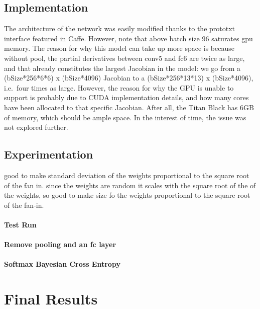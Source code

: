 \documentclass[a4paper,11pt]{article}
\begin{document}
\subsection{Implementation}

The architecture of the network was easily modified thanks to the prototxt interface featured in Caffe. However, note that above batch size 96 saturates gpu memory. The reason for why this model can take up more space is because without pool, the partial derivatives between conv5 and fc6 are twice as large, and that already constitutes the largest Jacobian in the model: we go from a (bSize*256*6*6) x (bSize*4096) Jacobian to a (bSize*256*13*13) x (bSize*4096), i.e.\ four times as large. However, the reason for why the GPU is unable to support is probably due to CUDA implementation details, and how many cores have been allocated to that specific Jacobian. After all, the Titan Black has 6GB of memory, which should be ample space. In the interest of time, the issue was not explored further. 

\subsection{Experimentation}

good to make standard deviation of the weights proportional to the square root of the fan in. 
since the weights are random it scales with the square root of the of the weights, so good to make size fo the weights proportional to the square root of the fan-in. 

\paragraph{Test Run}


     
     
\paragraph{Remove pooling and an fc layer}

\paragraph{Softmax Bayesian Cross Entropy}



\section{Final Results}
\end{document}
